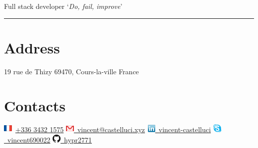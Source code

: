 \documentclass[]{friggeri-cv}
\begin{document}
      {Full stack developer}
\hfill \lq\textit{Do, fail, improve}\rq

\rule{397pt}{8pt}

\begin{aside}
  \section{Address}
  \hspace{1cm}
    19 rue de Thizy
    69470, Cours-la-ville
    France
  \section{Contacts}
  \hspace{1cm}
    \vspace{0.5mm}\includegraphics[scale=0.60]{img/france.png}~\href{tel:+33634321575}{+336 3432 1575}
    \vspace{0.5mm}\hspace{-2cm}\href{mailto:vincent.castelluci@gmail.com}{\includegraphics[scale=0.60]{img/mail.png}~vincent@castelluci.xyz}
    \vspace{0.5mm}\href{https://www.linkedin.com/in/vincent-castelluci-363939170}{\includegraphics[scale=0.60]{img/linkedin.png}~vincent-castelluci}
    \vspace{0.5mm}\href{skype://vincent690022?userinfo}{\includegraphics[scale=0.60]{img/skype.png}~vincent690022}
    \vspace{0.5mm}\href{https://github.com/hypr2771}{\includegraphics[scale=0.60]{img/github.png}~hypr2771}
    ~

\end{aside}
\end{document}
